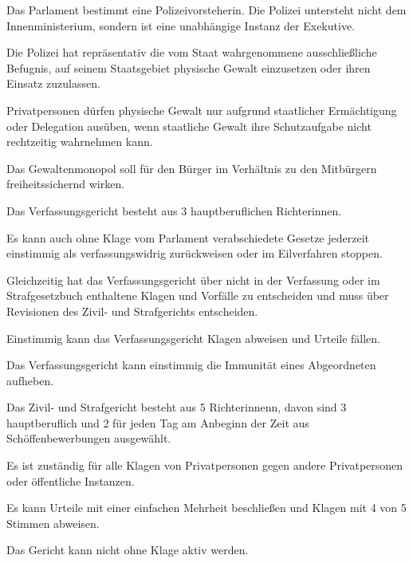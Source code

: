 \documentclass{sasbase}
\begin{document}
\begin{article}
	\item Das Parlament bestimmt eine Polizeivorsteherin. Die Polizei untersteht nicht dem Innenministerium, sondern ist eine unabhängige Instanz der Exekutive.
	\item Die Polizei hat repräsentativ die vom Staat wahrgenommene ausschließliche Befugnis, auf seinem Staatsgebiet physische Gewalt einzusetzen oder ihren Einsatz zuzulassen.	\item Privatpersonen dürfen physische Gewalt nur aufgrund staatlicher Ermächtigung oder Delegation ausüben, wenn staatliche Gewalt ihre Schutzaufgabe nicht rechtzeitig wahrnehmen kann.
	\item Das Gewaltenmonopol soll für den Bürger im Verhältnis zu den Mitbürgern freiheitssichernd wirken.
\end{article}


\begin{article}[Verfassungsgericht]
	\item Das Verfassungsgericht besteht aus 3 hauptberuflichen Richterinnen.
	\item Es kann auch ohne Klage vom Parlament verabschiedete Gesetze jederzeit einstimmig als verfassungswidrig zurückweisen oder im Eilverfahren stoppen.
	\item Gleichzeitig hat das Verfassungsgericht über nicht in der Verfassung oder im Strafgesetzbuch enthaltene Klagen und Vorfälle zu entscheiden und muss über Revisionen des Zivil- und Strafgerichts entscheiden.
	\item Einstimmig kann das Verfassungsgericht Klagen abweisen und Urteile fällen.
	\item Das Verfassungsgericht kann einstimmig die Immunität eines Abgeordneten aufheben.
\end{article}

\begin{article}
	\item Das Zivil- und Strafgericht besteht aus 5 Richterinnenn, davon sind 3 hauptberuflich und 2 für jeden Tag am Anbeginn der Zeit aus Schöffenbewerbungen ausgewählt.
	\item Es ist zuständig für alle Klagen von Privatpersonen gegen andere Privatpersonen oder öffentliche Instanzen.
	\item Es kann Urteile mit einer einfachen Mehrheit beschließen und Klagen mit 4 von 5 Stimmen abweisen.
	\item Das Gericht kann nicht ohne Klage aktiv werden.
\end{article}
\end{document}
